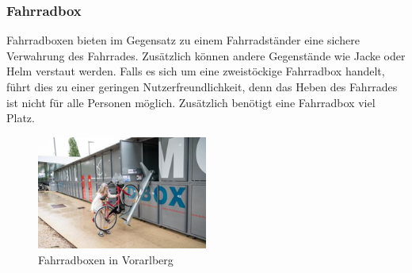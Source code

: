 \subsubsection{Fahrradbox}
Fahrradboxen bieten im Gegensatz zu einem Fahrradständer eine sichere Verwahrung des Fahrrades. Zusätzlich können andere Gegenstände wie Jacke oder Helm verstaut werden. Falls es sich um eine zweistöckige Fahrradbox handelt, führt dies zu einer geringen Nutzerfreundlichkeit, denn das Heben des Fahrrades ist nicht für alle Personen möglich. Zusätzlich benötigt eine Fahrradbox viel Platz.

\begin{figure}[H]
    \centering
    \includegraphics[width=0.5\textwidth]{images/fahrradbox.png}
    \caption{Fahrradboxen in Vorarlberg }
    \label{fig:fahrradbox}
\end{figure}
